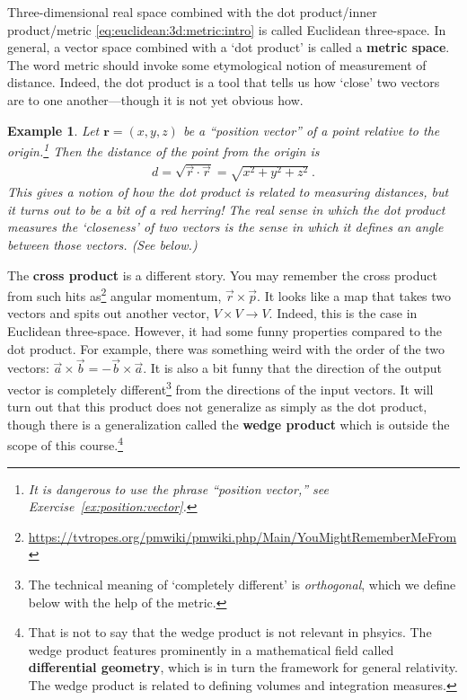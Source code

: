 \documentclass[12pt]{article}
\newtheorem{example}{Example}[section]
\begin{document}
Three-dimensional real space combined with the dot product/inner product/metric \eqref{eq:euclidean:3d:metric:intro} is called Euclidean three-space. In general, a vector space combined with a `dot product' is called a \textbf{metric space}. The word metric should invoke some etymological notion of measurement of distance. Indeed, the dot product is a tool that tells us how `close' two vectors are to one another---though it is not yet obvious how.

\begin{example}
Let $\mathbf{r}=(x,y,z)$ be a ``position vector'' of a point relative to the origin.\footnote{It is dangerous to use the phrase ``position vector,'' see Exercise~\ref{ex:position:vector}.} Then the distance of the point from the origin is
\begin{align}
    d = \sqrt{\vec{r}\cdot\vec{r}} =
    \sqrt{x^2+y^2 +z^2} \ .
    \label{eq:distance:in:space}
\end{align}
This gives a notion of how the dot product is related to measuring distances, but it turns out to be a bit of a red herring! The real sense in which the dot product measures the `closeness' of two vectors is the sense in which it defines an angle between those vectors. (See below.)
\end{example}

The \textbf{cross product} is a different story. You may remember the cross product from such hits as\footnote{\url{https://tvtropes.org/pmwiki/pmwiki.php/Main/YouMightRememberMeFrom}} angular momentum, $\vec{r}\times\vec{p}$. It looks like a map that takes two vectors and spits out another vector, $V\times V \to V$. Indeed, this is the case in Euclidean three-space. However, it had some funny properties compared to the dot product. For example, there was something weird with the order of the two vectors: $\vec{a}\times \vec{b}  = - \vec{b}\times \vec{a}$. It is also a bit funny that the direction of the output vector is completely different\footnote{The technical meaning of `completely different' is \emph{orthogonal}, which we define below with the help of the metric.} from the directions of the input vectors. It will turn out that this product does not generalize as simply as the dot product, though there is a generalization called the \textbf{wedge product} which is outside the scope of this course.\footnote{That is not to say that the wedge product is not relevant in phsyics. The wedge product features prominently in a mathematical field called \textbf{differential geometry}, which is in turn the framework for general relativity. The wedge product is related to defining volumes and integration measures.}
\end{document}
